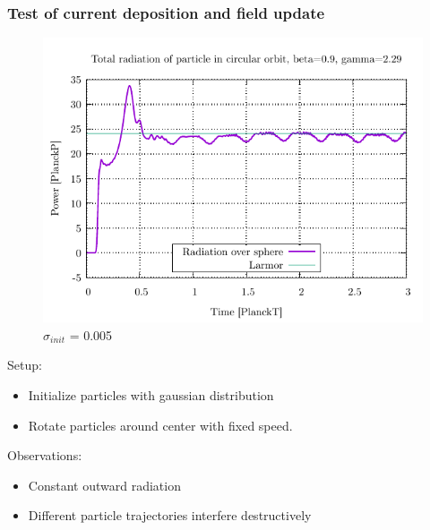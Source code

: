 \documentclass[5pt]{beamer}
\begin{document}
\begin{frame}
  \frametitle{Test of current deposition and field update}
  \begin{minipage}{0.45\textwidth}
    \begin{figure}[h]
      \centering
      \includegraphics[width=\columnwidth]{radplot_goodres.pdf}
      \caption{$\sigma_{init}$ = 0.005}
      \label{fig:smallvar}
    \end{figure}
  \end{minipage}
  \hfill
  \begin{minipage}{0.5\textwidth}
  
  Setup:
  \begin{itemize}
    \item[\cdot] Initialize particles with gaussian distribution
    \item[\cdot] Rotate particles around center with fixed speed.
  \end{itemize} 
  Observations:
  \begin{itemize}
    \item[\cdot] Constant outward radiation
    \item[\cdot] Different particle trajectories interfere destructively
  \end{itemize}
\end{minipage}
\end{frame}
\end{document}
